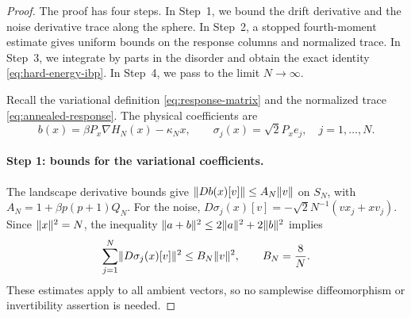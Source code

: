 \begin{proof}
The proof has four steps. In Step~1, we bound the drift derivative and the noise derivative trace along the sphere. In Step~2, a stopped fourth-moment estimate gives uniform bounds on the response columns and normalized trace. In Step~3, we integrate by parts in the disorder and obtain the exact identity \eqref{eq:hard-energy-ibp}. In Step~4, we pass to the limit $N\to\infty$.

Recall the variational definition \eqref{eq:response-matrix} and the normalized trace \eqref{eq:annealed-response}. The physical coefficients are
\[
 b(x)=\beta P_x\nabla H_N(x)-\kappa_Nx,\qquad
 \sigma_j(x)=\sqrt2P_xe_j,\quad j=1,\dots,N.
\]

\paragraph{Step 1: bounds for the variational coefficients.}
The landscape derivative bounds give $\lVert Db(x)[v]\rVert\le A_N\lVert v\rVert$ on $S_N$, with $A_N=1+\beta p(p+1)Q_N$.
For the noise, $D\sigma_j(x)[v]=-\sqrt2N^{-1}(vx_j+xv_j)$. Since $\lVert x\rVert^2=N$, the inequality $\lVert a+b\rVert^2\le2\lVert a\rVert^2+2\lVert b\rVert^2$ implies
\begin{equation}\label{eq:tangent-flow-lognorm}
 \sum_{j=1}^N\lVert D\sigma_j(x)[v]\rVert^2\le B_N\lVert v\rVert^2,
 \qquad B_N=\frac8N.
\end{equation}
These estimates apply to all ambient vectors, so no samplewise diffeomorphism or invertibility assertion is needed.


\end{proof}
